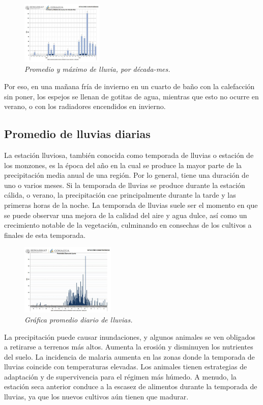 \documentclass[12pt]{article}
\begin{document}
\begin{figure} 
\includegraphics[width=0.35\textwidth]{Mlluvia.jpeg}
\caption{\textit{Promedio y máximo de lluvia, por década-mes.}}
\end{figure}

Por eso, en una mañana fría de invierno en un cuarto de baño con la calefacción sin poner, los espejos se llenan de gotitas de agua, mientras que esto no ocurre en verano, o con los radiadores encendidos en invierno.

\subsection{Promedio de lluvias diarias}
	La estación lluviosa, también conocida como temporada de lluvias o estación de los monzones, es la época del año en la cual se produce la mayor parte de la precipitación media anual de una región. Por lo general, tiene una duración de uno o varios meses. Si la temporada de lluvias se produce durante la estación cálida, o verano, la precipitación cae principalmente durante la tarde y las primeras horas de la noche. La temporada de lluvias suele ser el momento en que se puede observar una mejora de la calidad del aire y agua dulce, así como un crecimiento notable de la vegetación, culminando en consechas de los cultivos a finales de esta temporada. 
	
	\begin{figure} 
\includegraphics[width=0.4\textwidth]{Plluvia.jpeg}
\caption{\textit{Gráfica promedio diario de lluvias.}}
\end{figure}
	
	La precipitación puede causar inundaciones, y algunos animales se ven obligados a retirarse a terrenos más altos. Aumenta la erosión y disminuyen los nutrientes del suelo. La incidencia de malaria aumenta en las zonas donde la temporada de lluvias coincide con temperaturas elevadas. Los animales tienen estrategias de adaptación y de supervivencia para el régimen más húmedo. A menudo, la estación seca anterior conduce a la escasez de alimentos durante la temporada de lluvias, ya que los nuevos cultivos aún tienen que madurar.
	
\end{document}
